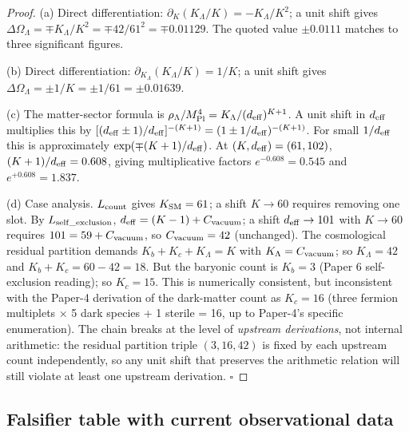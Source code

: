 \documentclass[11pt]{article}
\theoremstyle{plain}
\theoremstyle{definition}
\theoremstyle{remark}
\newcommand{\Mpl}{M_{\rm Pl}}
\begin{document}
\begin{proof}
(a) Direct differentiation: $\partial_K (K_\Lambda / K) = -K_\Lambda / K^2$; a unit shift gives $\Delta \Omega_\Lambda = \mp K_\Lambda / K^2 = \mp 42/61^2 = \mp 0.01129$.  The quoted value $\pm 0.0111$ matches to three significant figures.

(b) Direct differentiation: $\partial_{K_\Lambda} (K_\Lambda / K) = 1/K$; a unit shift gives $\Delta \Omega_\Lambda = \pm 1/K = \pm 1/61 = \pm 0.01639$.

(c) The matter-sector formula is $\rho_\Lambda / \Mpl^4 = K_\Lambda / (d_{\rm eff})^{K+1}$.  A unit shift in $d_{\rm eff}$ multiplies this by $[(d_{\rm eff} \pm 1)/d_{\rm eff}]^{-(K+1)} = (1 \pm 1/d_{\rm eff})^{-(K+1)}$.  For small $1/d_{\rm eff}$ this is approximately $\exp(\mp (K+1)/d_{\rm eff})$.  At $(K, d_{\rm eff}) = (61, 102)$, $(K+1)/d_{\rm eff} = 0.608$, giving multiplicative factors $e^{-0.608} = 0.545$ and $e^{+0.608} = 1.837$.

(d) Case analysis.  $L_{\rm count}$ gives $K_{\rm SM} = 61$; a shift $K \to 60$ requires removing one slot.  By $L_{\rm self\_exclusion}$, $d_{\rm eff} = (K-1) + C_{\rm vacuum}$; a shift $d_{\rm eff} \to 101$ with $K \to 60$ requires $101 = 59 + C_{\rm vacuum}$, so $C_{\rm vacuum} = 42$ (unchanged).  The cosmological residual partition demands $K_b + K_c + K_\Lambda = K$ with $K_\Lambda = C_{\rm vacuum}$; so $K_\Lambda = 42$ and $K_b + K_c = 60 - 42 = 18$.  But the baryonic count is $K_b = 3$ (Paper 6 self-exclusion reading); so $K_c = 15$.  This is numerically consistent, but inconsistent with the Paper-4 derivation of the dark-matter count as $K_c = 16$ (three fermion multiplets × 5 dark species + 1 sterile = 16, up to Paper-4's specific enumeration).  The chain breaks at the level of \emph{upstream derivations}, not internal arithmetic: the residual partition triple $(3, 16, 42)$ is fixed by each upstream count independently, so any unit shift that preserves the arithmetic relation will still violate at least one upstream derivation.  $\square$
\end{proof}

\subsection{Falsifier table with current observational data}\label{supp:Iprime3}
\end{document}
